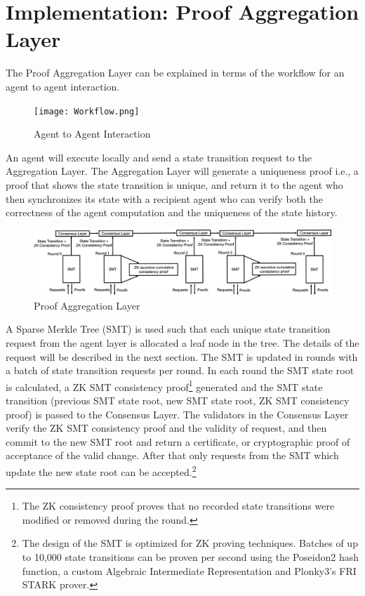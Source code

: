 \documentclass{article}
\begin{document}
\section{Implementation: Proof Aggregation Layer}

The Proof Aggregation Layer can be explained in terms of the workflow for an agent to agent interaction.

\begin{figure}[H]
    \centering
    \texttt{[image: Workflow.png]}
    \caption{Agent to Agent Interaction}
    \label{fig:Workflow}
\end{figure}


An agent will execute locally and send a state transition request to the Aggregation Layer. The Aggregation Layer will generate a uniqueness proof i.e., a proof that shows the state transition is unique, and return it to the agent who then synchronizes its state with a recipient agent who can verify both the correctness of the agent computation and the uniqueness of the state history.



\begin{figure}[htbp]
    \centering
    \includegraphics[width=1\textwidth]{SMT-Infra2.png}
    \caption{Proof Aggregation Layer}
    \label{fig:SMT}
\end{figure}


 A Sparse Merkle Tree (SMT) is used such that each unique state transition request from the agent layer is allocated a leaf node in the tree. The details of the request will be described in the next section. The SMT is updated in rounds with a batch of state transition requests per round. In each round the SMT state root is calculated, a ZK SMT consistency proof\footnote{The ZK consistency proof proves that no recorded state transitions were modified or removed during the round.} generated and the SMT state transition (previous SMT state root, new SMT state root, ZK SMT consistency proof) is passed to the Consensus Layer. The validators in the Consensus Layer verify the ZK SMT consistency proof and the validity of request, and then commit to the new SMT root and return a certificate, or cryptographic proof of acceptance of the valid change. After that only requests from the SMT which update the new state root can be accepted.\footnote{The design of the SMT is optimized for ZK proving techniques. Batches of up to 10,000 state transitions can be proven per second using the Poseidon2 hash function, a custom Algebraic Intermediate Representation and Plonky3's FRI STARK prover.}
 
\end{document}
